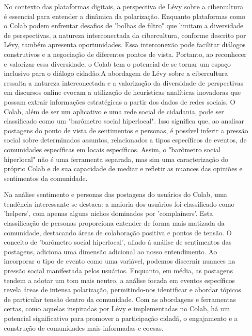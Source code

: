 No contexto das plataformas digitais, a perspectiva de Lévy sobre a cibercultura é essencial para entender a dinâmica da polarização. Enquanto plataformas como o Colab podem enfrentar desafios de "bolhas de filtro" que limitam a diversidade de perspectivas, a natureza interconectada da cibercultura, conforme descrito por Lévy, também apresenta oportunidades. Essa interconexão pode facilitar diálogos construtivos e a negociação de diferentes pontos de vista. Portanto, ao reconhecer e valorizar essa diversidade, o Colab tem o potencial de se tornar um espaço inclusivo para o diálogo cidadão.A abordagem de Lévy sobre a cibercultura ressalta a natureza interconectada e a valorização da diversidade de perspectivas em discursos online evocam a utilização de heurísticas analíticas inovadoras que possam extrair informações estratégicas a partir dos dados de redes sociais. O Colab, além de ser um aplicativo e uma rede social de cidadania, pode ser classificado como um "barômetro social hiperlocal". Isso significa que, ao analisar postagens do ponto de vista de sentimentos e personas, é possível inferir a pressão social sobre determinados assuntos, relacionados a tipos específicos de eventos, de comunidades específicas em locais específicos. Assim, o "barômetro social hiperlocal" não é uma ferramenta separada, mas sim uma caracterização do próprio Colab e de sua capacidade de mediar e refletir as nuances das opiniões e sentimentos da comunidade.

Na análise sentimento e personas das postagens do usuários do Colab, uma tendência interessante se destaca: a maioria dos usuários foi classificado como 'helpers', com apenas alguns nichos dominados por 'complainers'. Esta classificação de personas proporciona entender de forma mais matizada da comunidade, destacando áreas de colaboração positiva e pontos de tensão. O conceito de 'barômetro social hiperlocal', aliado à análise de sentimentos das postagens, adiciona uma dimensão adicional ao nosso entendimento. Ao incorporar o tipo de evento como uma variável, podemos discernir nuances na pressão social manifestada pelos usuários. Enquanto, em média, as postagens tendem a adotar um tom mais neutro, a análise focada em eventos específicos revela áreas de intensa polarização, permitindo-nos identificar e abordar tópicos de particular tensão dentro da comunidade. Com as abordagens e ferramentas certas, como aquelas inspiradas por Lévy e implementadas no Colab, há um potencial significativo para promover a participação cidadã, o engajamento e a construção de comunidades mais informadas e coesas.